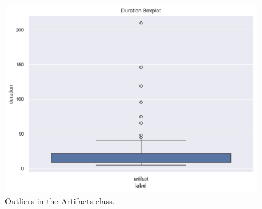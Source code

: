 \begin{figure}[H]
	\centering
	\includegraphics[width=1\columnwidth]{./images/DataExp_outliers_artifact.png}
	\caption{Outliers in the Artifacts class.}
	\label{fig:DataExp_outliers_Artifacts}
 \end{figure}
